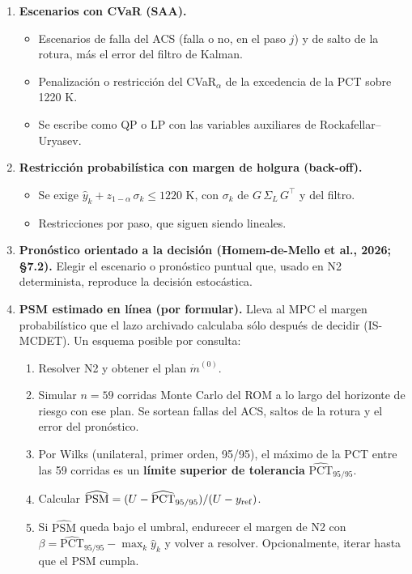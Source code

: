 \documentclass[11pt,a4paper]{article}
\begin{document}
\begin{enumerate}
\item \textbf{Escenarios con CVaR (SAA).}
\begin{itemize}
\item Escenarios de falla del ACS (falla o no, en el paso $j$) y de salto de la rotura, más el error del filtro de Kalman.
\item Penalización o restricción del CVaR$_\alpha$ de la excedencia de la PCT sobre 1220 K.
\item Se escribe como QP o LP con las variables auxiliares de Rockafellar–Uryasev.
\end{itemize}
\item \textbf{Restricción probabilística con margen de holgura (back-off).}
\begin{itemize}
\item Se exige $\hat y_k+z_{1-\alpha}\,\sigma_k\le1220$ K, con $\sigma_k$ de $G\,\Sigma_L\,G^\top$ y del filtro.
\item Restricciones por paso, que siguen siendo lineales.
\end{itemize}
\item \textbf{Pronóstico orientado a la decisión (Homem-de-Mello et al., 2026; \S{}7.2).} Elegir el escenario o pronóstico puntual que, usado en N2 determinista, reproduce la decisión estocástica.
\item \textbf{PSM estimado en línea (por formular).} Lleva al MPC el margen probabilístico que el lazo archivado calculaba sólo después de decidir (IS-MCDET). Un esquema posible por consulta:
\begin{enumerate}
\item Resolver N2 y obtener el plan $\dot m^{(0)}$.
\item Simular $n=59$ corridas Monte Carlo del ROM a lo largo del horizonte de riesgo con ese plan. Se sortean fallas del ACS, saltos de la rotura y el error del pronóstico.
\item Por Wilks (unilateral, primer orden, 95/95), el máximo de la PCT entre las 59 corridas es un \textbf{límite superior de tolerancia} $\widehat{\mathrm{PCT}}_{95/95}$.
\item Calcular $\widehat{\mathrm{PSM}}=(U-\widehat{\mathrm{PCT}}_{95/95})/(U-y_{\rm ref})$.
\item Si $\widehat{\mathrm{PSM}}$ queda bajo el umbral, endurecer el margen de N2 con $\beta=\widehat{\mathrm{PCT}}_{95/95}-\max_k\hat y_k$ y volver a resolver. Opcionalmente, iterar hasta que el PSM cumpla.
\end{enumerate}
\end{enumerate}
\end{document}
